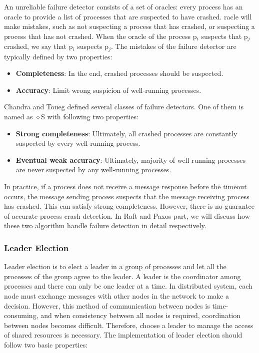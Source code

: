 \documentclass[12pt, a4paper]{article}
\begin{document}
An unreliable failure detector consists of a set of oracles: every process has
an oracle to provide a list of processes that are suspected to have crashed.
racle will make mistakes, such as not suspecting a process that has crashed, or
suspecting a process that has not crashed. When the oracle of the process
p$_{i}$ suspects that p$_{j}$ crashed, we say that p$_{i}$ suspects p$_{j}$.
The mistakes of the failure detector are typically defined by two properties:

\begin{itemize}
  \item \textbf{Completeness}: In the end, crashed processes should be
  suspected.
  \item \textbf{Accuracy}: Limit wrong suspicion of well-running processes.
\end{itemize}

Chandra and Toueg\cite{chandra1996unreliable} defined several classes of failure
detectors. One of them is named as $\diamond$S with following two properties:

\begin{itemize}
  \item \textbf{Strong completeness}: Ultimately, all crashed processes are
  constantly suspected by every well-running process.
  \item \textbf{Eventual weak accuracy}: Ultimately, majority of well-running
  processes are never suspected by any well-running processes.
\end{itemize}

In practice, if a process does not receive a message response before the timeout occurs, the message sending process suspects that the message receiving process has crashed. This can satisfy strong completeness. However, there is no guarantee of accurate process crash detection. In Raft and Paxos part, we will discuss how these two algorithm handle failure detection in detail respectively.

\subsubsection{Leader Election}

Leader election is to elect a leader in a group of processes and let all the processes of the group agree to the leader. A leader is the coordinator among processes and there can only be one leader at a time. In distributed system, each node must exchange messages with other nodes in the network to make a decision. However, this method of communication between nodes is time-consuming, and when consistency between all nodes is required, coordination between nodes becomes difficult. Therefore, choose a leader to manage the access of shared resources is necessary. The implementation of leader election should follow two basic properties\cite{nugraheni2009formal}:
\end{document}
